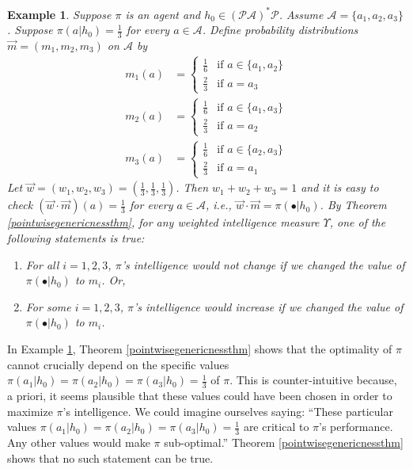 \documentclass{article}
\newtheorem{example}[theorem]{Example}
\begin{document}
\begin{example}
\label{genericnessexample}
    Suppose $\pi$ is an agent and $h_0\in(\mathcal P\mathcal A)^*\mathcal P$.
    Assume $\mathcal A=\{a_1,a_2,a_3\}$.
    Suppose $\pi(a|h_0)=\frac13$ for every $a\in\mathcal A$.
    Define probability distributions $\vec m=(m_1,m_2,m_3)$ on $\mathcal A$ by
    \begin{align*}
        m_1(a) &=
        \begin{cases}
            \frac16 &\mbox{if $a\in\{a_1,a_2\}$}\\
            \frac23 &\mbox{if $a=a_3$}
        \end{cases}\\
        m_2(a) &=
        \begin{cases}
            \frac16 &\mbox{if $a\in\{a_1,a_3\}$}\\
            \frac23 &\mbox{if $a=a_2$}
        \end{cases}\\
        m_3(a) &=
        \begin{cases}
            \frac16 &\mbox{if $a\in\{a_2,a_3\}$}\\
            \frac23 &\mbox{if $a=a_1$}
        \end{cases}
    \end{align*}
    Let $\vec w=(w_1,w_2,w_3)=(\frac13,\frac13,\frac13)$. Then $w_1+w_2+w_3=1$ and
    it is easy to check
    $(\vec w\cdot\vec m)(a)=\frac13$ for every $a\in\mathcal A$,
    i.e., $\vec w\cdot\vec m=\pi(\bullet|h_0)$.
    By Theorem \ref{pointwisegenericnessthm},
    for any weighted intelligence measure $\Upsilon$,
    one of the following statements is true:
    \begin{enumerate}
        \item
        For all $i=1,2,3$, $\pi$'s intelligence would not change if we
        changed the value of $\pi(\bullet|h_0)$ to $m_i$. Or,
        \item
        For some $i=1,2,3$, $\pi$'s intelligence would increase if
        we changed the value of $\pi(\bullet|h_0)$ to $m_i$.
    \end{enumerate}
\end{example}

In Example \ref{genericnessexample}, Theorem \ref{pointwisegenericnessthm} shows
that the optimality of $\pi$ cannot crucially depend on the specific values
$\pi(a_1|h_0)=\pi(a_2|h_0)=\pi(a_3|h_0)=\frac13$ of $\pi$.
This is counter-intuitive because, a priori, it seems
plausible that these values could have been chosen
in order to maximize $\pi$'s intelligence. We could imagine ourselves
saying: ``These particular values $\pi(a_1|h_0)=\pi(a_2|h_0)=\pi(a_3|h_0)=\frac13$ are
critical to $\pi$'s
performance. Any other values would make $\pi$ sub-optimal.''
Theorem \ref{pointwisegenericnessthm} shows that no such statement can be true.
\end{document}

